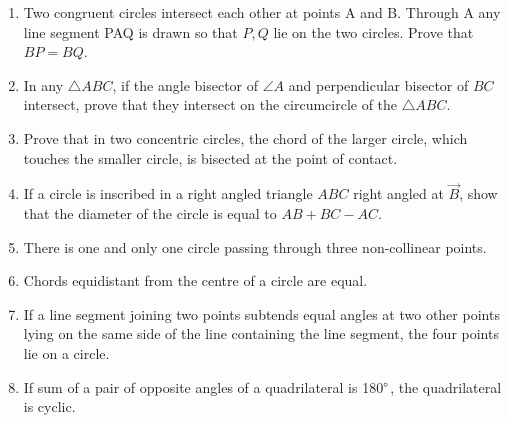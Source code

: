 \begin{enumerate}[label=\thesubsection.\arabic*,ref=\thesubsection.\theenumi]
\item Two congruent circles intersect each other at points A and B. Through A any line segment PAQ is drawn so that $P, Q$ lie on the two circles. Prove that $BP = BQ$.
\item In any $\triangle ABC$, if the angle bisector of $\angle A$ and perpendicular bisector of $BC$ intersect, prove that they intersect on the circumcircle of the $\triangle ABC$.
%
%
\item Prove that in two concentric circles, the chord of the larger circle, which touches the smaller circle, is bisected at the point of contact.
%
%
%
     	\item If a circle is inscribed in a right angled triangle $ABC$ right angled at $\vec{B}$, show that the diameter of the circle is equal to $AB+BC-AC$.
\item  There is one and only one circle passing through three non-collinear points. 
\item Chords equidistant from the centre  of a circle  are equal.
\item  If a line segment joining two points subtends equal angles at two other points lying on the same side of the line containing the line segment, the four points lie on a circle. 

\item  If sum of a pair of opposite angles of a quadrilateral is 180$\degree$, the quadrilateral is cyclic.
\end{enumerate}
